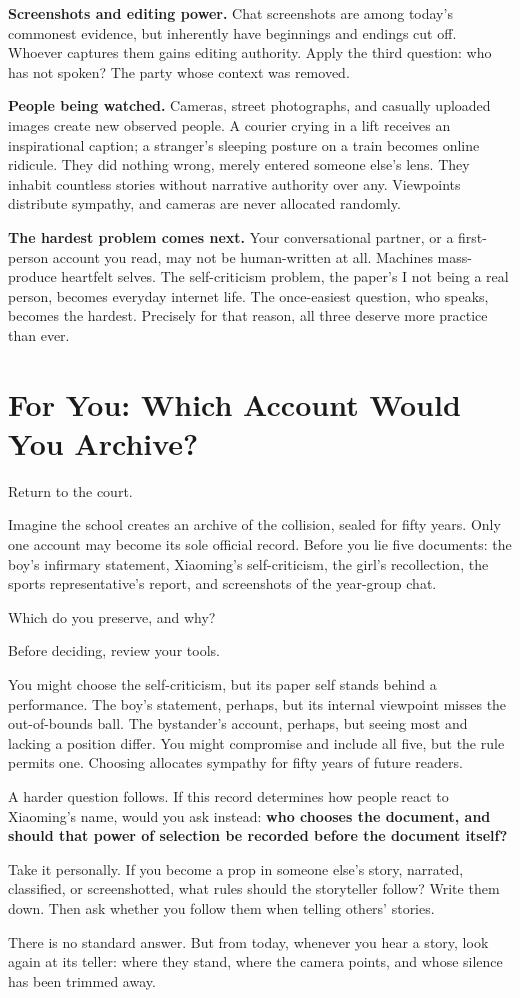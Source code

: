 \textbf{Screenshots and editing power.} Chat screenshots are among today's commonest evidence, but inherently have beginnings and endings cut off. Whoever captures them gains editing authority. Apply the third question: who has not spoken? The party whose context was removed.

\textbf{People being watched.} Cameras, street photographs, and casually uploaded images create new observed people. A courier crying in a lift receives an inspirational caption; a stranger's sleeping posture on a train becomes online ridicule. They did nothing wrong, merely entered someone else's lens. They inhabit countless stories without narrative authority over any. Viewpoints distribute sympathy, and cameras are never allocated randomly.

\textbf{The hardest problem comes next.} Your conversational partner, or a first-person account you read, may not be human-written at all. Machines mass-produce heartfelt selves. The self-criticism problem, the paper's I not being a real person, becomes everyday internet life. The once-easiest question, who speaks, becomes the hardest. Precisely for that reason, all three deserve more practice than ever.

\section[For You: Which Account Enters the Archive?]{For You: Which Account Would You Archive?}
Return to the court.

Imagine the school creates an archive of the collision, sealed for fifty years. Only one account may become its sole official record. Before you lie five documents: the boy's infirmary statement, Xiaoming's self-criticism, the girl's recollection, the sports representative's report, and screenshots of the year-group chat.

Which do you preserve, and why?

Before deciding, review your tools.

You might choose the self-criticism, but its paper self stands behind a performance. The boy's statement, perhaps, but its internal viewpoint misses the out-of-bounds ball. The bystander's account, perhaps, but seeing most and lacking a position differ. You might compromise and include all five, but the rule permits one. Choosing allocates sympathy for fifty years of future readers.

A harder question follows. If this record determines how people react to Xiaoming's name, would you ask instead: \textbf{who chooses the document, and should that power of selection be recorded before the document itself?}

Take it personally. If you become a prop in someone else's story, narrated, classified, or screenshotted, what rules should the storyteller follow? Write them down. Then ask whether you follow them when telling others' stories.

There is no standard answer. But from today, whenever you hear a story, look again at its teller: where they stand, where the camera points, and whose silence has been trimmed away.
